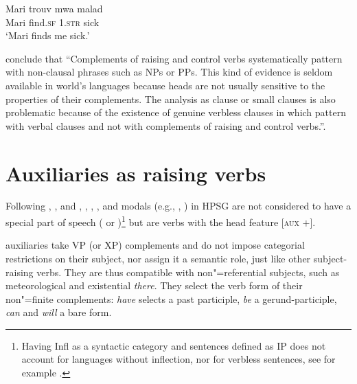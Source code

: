 \ex 
\gll Mari trouv              mwa               malad\\
     Mari find.\textsc{sf}  1\SG.\textsc{str} sick\\
\glt `Mari finds me sick.' \label{ex-anne4}
\zl

\citet[]{HenriandLaurens2011} conclude that ``Complements of raising and control verbs
systematically pattern with non-clausal phrases such as NPs or PPs. This kind of evidence is seldom
available in world's languages because heads are not usually sensitive to the properties of their
complements. The analysis as clause or small clauses is also problematic because of the existence of
genuine verbless clauses in  which pattern with verbal clauses and not with
complements of raising and control verbs.''.


\section{Auxiliaries as raising verbs}
\label{sec-auxiliaries-as-raising-verbs}

Following \citet{Ross69a-u}, \citet{Gazdaretal1982}, and \citet{Sagetal2020}, , , , and
modals (e.g., , ) in HPSG are not considered to have a special part of speech
( or )\footnote{Having Infl as a syntactic category and sentences defined as IP does not account for languages without inflection, nor for verbless sentences, see for example .} but are verbs with the head feature [\textsc{aux} $+$].
 
  auxiliaries take VP (or XP) complements and do not impose categorial restrictions on their subject, nor assign it a semantic role,
   just like
 other subject-raising verbs. They are thus compatible with non"=referential subjects, such as
 meteorological  and existential \textit{there}. They select the verb form of their
 non"=finite complements: \textit{have} selects a past participle, \textit{be} a gerund-participle,
 \textit{can} and \textit{will} a bare form.

